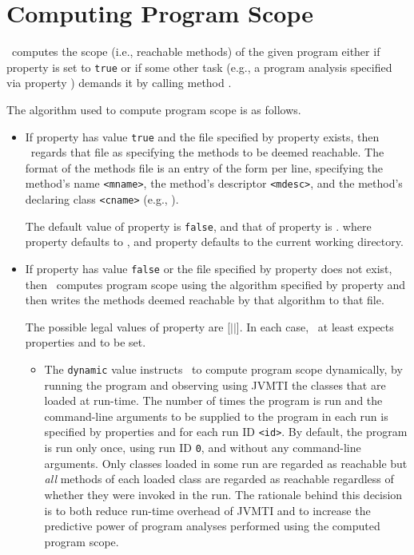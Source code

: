 \section{Computing Program Scope}
\label{sec:building-scope}

\Chord\ computes the scope (i.e., reachable methods) of the given program
either if property  is set to {\tt true} or if some other task (e.g.,
a program analysis specified via property ) demands it by
calling method .

The algorithm used to compute program scope is as follows.

\begin{itemize}
\item
If property  has value {\tt true} and the file specified by property
 exists,
then \Chord\ regards that file as specifying the methods to be deemed reachable.
The format of the methods file is an entry of the form  per line,
specifying the method's name {\tt <mname>}, the method's descriptor {\tt <mdesc>}, and the
method's declaring class {\tt <cname>}
(e.g., \code{main:([Ljava/lang/String;)V@foo.bar.Main}).

The default value of property  is {\tt false}, and
that of property  is .
where property  defaults to ,
and property  defaults to the current working directory.

\item
If property  has value {\tt false} or the file specified by
property  does not exist, then \Chord\ computes program scope
using the algorithm specified by property  and
then writes the methods deemed reachable by that algorithm to that file.

The possible legal values of property  are [$|$$|$].
In each case, \Chord\ at least expects properties  and 
to be set.

\begin{itemize}
\item
The {\tt dynamic} value instructs \Chord\ to compute program scope dynamically, by running the program
and observing using JVMTI the classes that are loaded at run-time.
The number of times the program is run and the command-line arguments to be supplied to
the program in each run is specified by properties  and
 for each run ID {\tt <id>}.  By default, the program is run only once, using run ID {\tt 0},
and without any command-line arguments.
Only classes loaded in some run are regarded as reachable but {\it all} methods of each loaded class are regarded
as reachable regardless of whether they were invoked in the run.
The rationale behind this decision is to both reduce run-time overhead of JVMTI and to increase the
predictive power of program analyses performed using the computed program scope.


\end{itemize}
\end{itemize}
